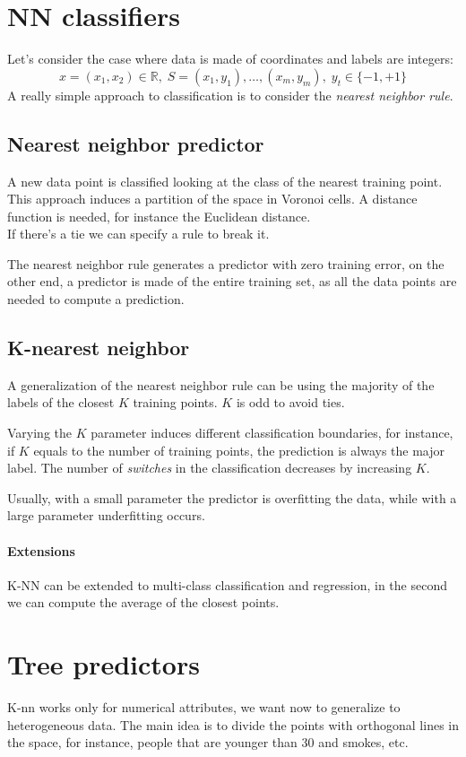 \section{NN classifiers}
Let's consider the case where data is made of coordinates and labels are integers:
$$x = (x_1, x_2) \in \mathbb{R},\;S = (x_1, y_1), \dots,(x_m, y_m),\;y_t \in \{-1, +1\}$$
A really simple approach to classification is to consider the \emph{nearest neighbor rule}.

\subsection{Nearest neighbor predictor}
A new data point is classified looking at the class of the nearest training point.
This approach induces a partition of the space in Voronoi cells. A distance 
function is needed, for instance the Euclidean distance.\\
If there's a tie we can specify a rule to break it.

The nearest neighbor rule generates a predictor with zero training error, 
on the other end, a predictor is made of the entire training set, as all the data points
are needed to compute a prediction.

\subsection{K-nearest neighbor}
A generalization of the nearest neighbor rule can be using the majority of the labels 
of the closest $K$ training points.
$K$ is odd to avoid ties.

Varying the $K$ parameter induces different classification boundaries, 
for instance, if $K$ equals to the number of training points, the prediction 
is always the major label. The number of \emph{switches} in the classification 
decreases by increasing $K$.

Usually, with a small parameter the predictor is overfitting the data, while 
with a large parameter underfitting occurs.

\paragraph{Extensions}
K-NN can be extended to multi-class classification and regression, 
in the second we can compute the average of the closest points.

\section{Tree predictors}
K-nn works only for numerical attributes, we want now to generalize
to heterogeneous data.
The main idea is to divide the points with orthogonal lines in the space, 
for instance, people that are younger than 30 and smokes, etc.

